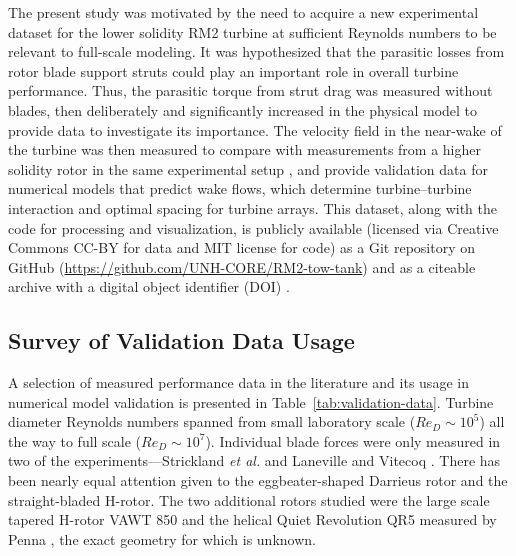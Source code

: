 \documentclass[10pt,letterpaper]{article}
\begin{document}
The present study was motivated by the need to acquire a new experimental
dataset for the lower solidity RM2 turbine at sufficient Reynolds numbers to be
relevant to full-scale modeling. It was hypothesized that the parasitic losses
from rotor blade support struts could play an important role in overall turbine
performance. Thus, the parasitic torque from strut drag was measured without
blades, then deliberately and significantly increased in the physical model to
provide data to investigate its importance. The velocity field in the near-wake
of the turbine was then measured to compare with measurements from a higher
solidity rotor in the same experimental setup \cite{Bachant2015-JoT}, and
provide validation data for numerical models that predict wake flows, which
determine turbine--turbine interaction and optimal spacing for turbine arrays.
This dataset, along with the code for processing and visualization, is publicly
available (licensed via Creative Commons CC-BY for data and MIT license for
code) as a Git repository on GitHub
(\url{https://github.com/UNH-CORE/RM2-tow-tank}) and as a citeable archive with
a digital object identifier (DOI) \cite{Bachant2015-RM2-data}.


\subsection*{Survey of Validation Data Usage}

A selection of measured performance data in the literature and its usage in
numerical model validation is presented in Table~\ref{tab:validation-data}.
Turbine diameter Reynolds numbers spanned from small laboratory scale ($Re_D
\sim 10^5$) all the way to full scale ($Re_D \sim 10^7$). Individual blade
forces were only measured in two of the experiments---Strickland \emph{et al.}
\cite{Strickland1981} and Laneville and Vitecoq \cite{Laneville1986}. There has
been nearly equal attention given to the eggbeater-shaped Darrieus rotor and the
straight-bladed H-rotor. The two additional rotors studied were the large scale
tapered H-rotor VAWT 850 \cite{Mays1990} and the helical Quiet Revolution QR5
measured by Penna \cite{Penna2008}, the exact geometry for which is unknown.
\end{document}
